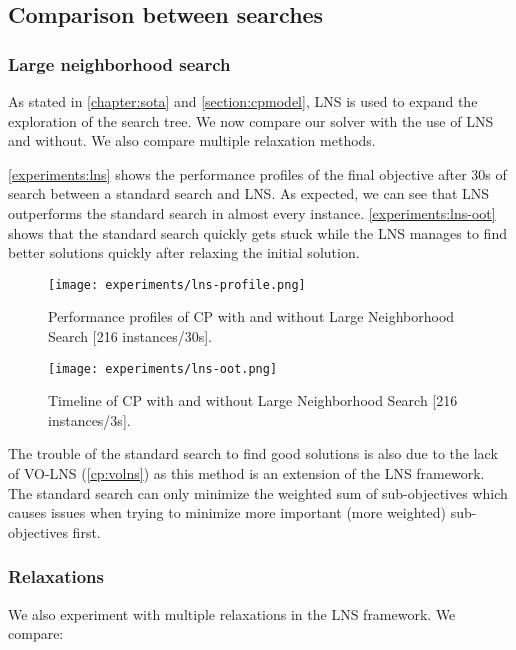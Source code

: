 \documentclass[../../thesis.tex]{subfiles}
\begin{document}
\subsection{Comparison between searches}

\subsubsection{Large neighborhood search}


As stated in \autoref{chapter:sota} and \autoref{section:cpmodel}, LNS is used to expand the exploration
of the search tree. We now compare our solver with the use of LNS and without. We also compare multiple 
relaxation methods.


\autoref{experiments:lns} shows the performance profiles of the final objective after 30s of search 
between a standard search and LNS. As expected, we can see that LNS outperforms the standard search 
in almost every instance. 
\autoref{experiments:lns-oot} shows that the standard search quickly gets stuck
while the LNS manages to find better solutions quickly after relaxing the initial solution.

\begin{figure}
  \centering
  \texttt{[image: experiments/lns-profile.png]}
  \caption{Performance profiles of CP with and without Large Neighborhood Search [216 instances/30s].}
  \label{experiments:lns}
\end{figure}


\begin{figure}
  \centering
  \texttt{[image: experiments/lns-oot.png]}
  \caption{Timeline of CP with and without Large Neighborhood Search [216 instances/3s].}
  \label{experiments:lns-oot}
\end{figure}


The trouble of the standard search to find good solutions is also due to the lack of VO-LNS (\autoref{cp:volns}) as 
this method is an extension of the LNS framework. The standard search can only minimize the weighted sum of sub-objectives
which causes issues when trying to minimize more important (more weighted) sub-objectives first.


\subsubsection{Relaxations}

We also experiment with multiple relaxations in the LNS framework. We compare:
\end{document}

